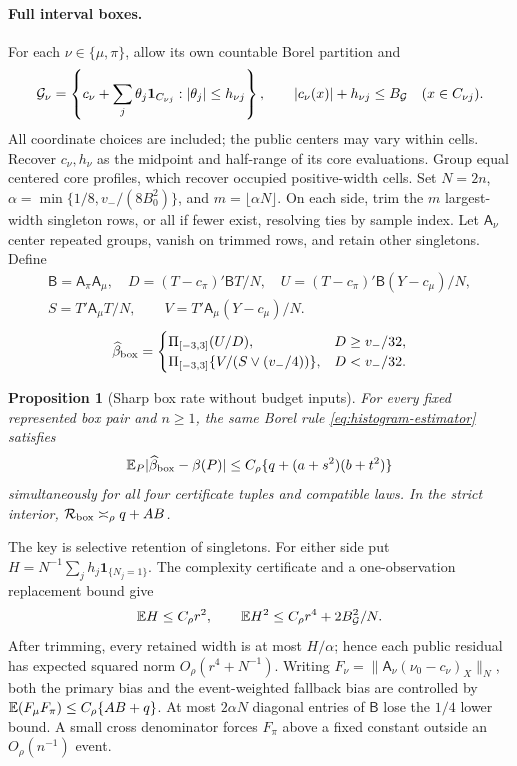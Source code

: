 \documentclass{article}
\newtheorem{proposition}[theorem]{Proposition}
\theoremstyle{definition}
\theoremstyle{remark}
\begin{document}
\paragraph{Full interval boxes.}
For each \(\nu\in\{\mu,\pi\}\), allow its own countable Borel partition and
\[
 \mathcal G_\nu=\left\{c_\nu+\sum_j\theta_j\mathbf1_{C_{\nu j}}:
 |\theta_j|\le h_{\nu j}\right\},\qquad
 |c_\nu(x)|+h_{\nu j}\le B_{\mathcal G}\quad(x\in C_{\nu j}).
\]
All coordinate choices are included; the public centers may vary within cells. Recover \(c_\nu,h_\nu\) as the midpoint and half-range of its core evaluations. Group equal centered core profiles, which recover occupied positive-width cells. Set \(N=2n\), \(\alpha=\min\{1/8,v_-/(8B_0^2)\}\), and \(m=\lfloor\alpha N\rfloor\). On each side, trim the \(m\) largest-width singleton rows, or all if fewer exist, resolving ties by sample index. Let \(\mathsf A_\nu\) center repeated groups, vanish on trimmed rows, and retain other singletons. Define
\[
 \begin{gathered}
 \mathsf B=\mathsf A_\pi\mathsf A_\mu,\quad
 D=(T-c_\pi)'\mathsf BT/N,\quad U=(T-c_\pi)'\mathsf B(Y-c_\mu)/N,\\
 S=T'\mathsf A_\mu T/N,\qquad V=T'\mathsf A_\mu(Y-c_\mu)/N.
 \end{gathered}
\]
\begin{equation}
 \widehat\beta_{\rm box}=
 \begin{cases}
 \Pi_{[-3,3]}(U/D),&D\ge v_-/32,\\
 \Pi_{[-3,3]}\{V/(S\vee(v_-/4))\},&D<v_-/32.
 \end{cases}
 \label{eq:histogram-estimator}
\end{equation}
\begin{proposition}[Sharp box rate without budget inputs]
\label{prop:histogram-adaptation}
For every fixed represented box pair and \(n\ge1\), the same Borel rule \eqref{eq:histogram-estimator} satisfies
\[
 \mathbb E_P|\widehat\beta_{\rm box}-\beta(P)|\le C_\rho\{q+(a+s^2)(b+t^2)\}
\]
simultaneously for all four certificate tuples and compatible laws. In the strict interior,
\(\mathcal R_{\rm box}\asymp_\rho q+AB\).
\end{proposition}
The key is selective retention of singletons. For either side put
\(H=N^{-1}\sum_jh_j\mathbf1_{\{N_j=1\}}\). The complexity certificate and a one-observation replacement bound give
\[
 \mathbb E H\le C_\rho r^2,\qquad
 \mathbb E H^2\le C_\rho r^4+2B_{\mathcal G}^2/N.
\]
After trimming, every retained width is at most \(H/\alpha\); hence each public residual has expected squared norm \(O_\rho(r^4+N^{-1})\). Writing
\(F_\nu=\|\mathsf A_\nu(\nu_0-c_\nu)_X\|_N\), both the primary bias and the event-weighted fallback bias are controlled by
\(\mathbb E(F_\mu F_\pi)\le C_\rho\{AB+q\}\).
At most \(2\alpha N\) diagonal entries of \(\mathsf B\) lose the \(1/4\) lower bound. A small cross denominator forces \(F_\pi\) above a fixed constant outside an \(O_\rho(n^{-1})\) event.
\end{document}
